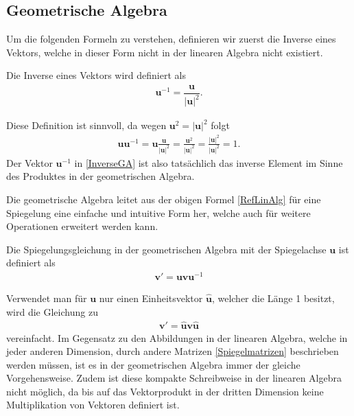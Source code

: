 \subsection{Geometrische Algebra}
Um die folgenden Formeln zu verstehen, definieren wir zuerst die Inverse eines Vektors, welche in dieser Form nicht in der linearen Algebra nicht existiert.
\begin{definition}
	Die Inverse eines Vektors wird definiert als
	\begin{align} \label{InverseGA}
		\mathbf{u}^{-1} = \dfrac{\mathbf{u}}{|\mathbf{u}|^2}. 
	\end{align}
\end{definition}
Diese Definition ist sinnvoll, da wegen $\mathbf{u}^2 = |\mathbf{u}|^2$ folgt
\begin{align}
	\mathbf{uu}^{-1} = \mathbf{u} \frac{\mathbf{u}}{|\mathbf{u}|^2} = \frac{\mathbf{u}^2}{|\mathbf{u}|^2} = \frac{|\mathbf{u}|^2}{|\mathbf{u}|^2} = 1.
\end{align}
Der Vektor $\mathbf{u}^{-1}$ in \eqref{InverseGA} ist also tatsächlich das inverse Element im Sinne des Produktes in der geometrischen Algebra.

Die geometrische Algebra leitet aus der obigen Formel \eqref{RefLinAlg} für eine Spiegelung eine einfache und intuitive Form her, welche auch für weitere Operationen erweitert werden kann.
\begin{definition}
	Die Spiegelungsgleichung in der geometrischen Algebra mit der Spiegelachse $\mathbf{u}$ ist definiert als
	\begin{align}\label{RefGA}
		\mathbf{v}' = \mathbf{uvu}^{-1}
	\end{align}
\end{definition}
Verwendet man für $\mathbf{u}$ nur einen Einheitsvektor $\mathbf{\hat{u}}$, welcher die Länge 1 besitzt, wird die Gleichung zu
\begin{align}
	\mathbf{v'} = \mathbf{\hat{u}v\hat{u}}
\end{align}
vereinfacht. Im Gegensatz zu den Abbildungen in der linearen Algebra, welche in jeder anderen Dimension, durch andere Matrizen \eqref{Spiegelmatrizen} beschrieben werden müssen, ist es in der geometrischen Algebra immer der gleiche Vorgehensweise. Zudem ist diese kompakte Schreibweise in der linearen Algebra nicht möglich, da bis auf das Vektorprodukt in der dritten Dimension keine Multiplikation von Vektoren definiert ist. 